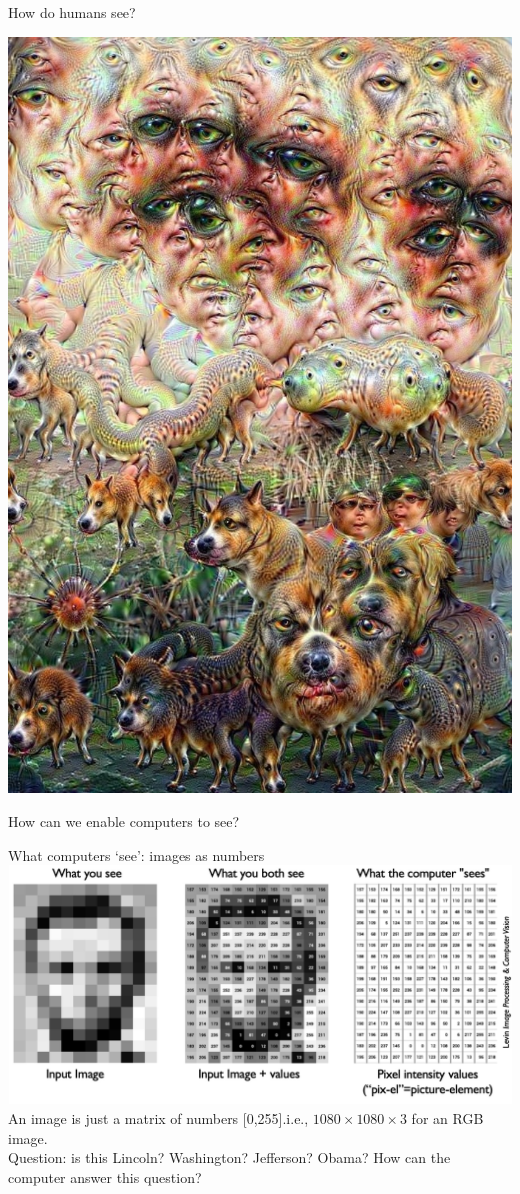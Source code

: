 \documentclass[default, aspectratio=169]{beamer}
\begin{document}
\begin{frame}{How do humans see?}
\begin{center}
			\includegraphics[keepaspectratio, scale=0.25]{pic/nothing.PNG}
		\end{center}
		How can we enable computers to see?
	\end{frame}
	\begin{frame}{What computers ‘see’: images as numbers}
		\centering
		\includegraphics[keepaspectratio, scale=0.35]{pic/what.png}
		\\{An image is just a matrix of numbers [0,255].i.e., $1080 \times 1080 \times 3$ for an RGB image.\\ Question: is this Lincoln? Washington? Jefferson? Obama?
			How can the computer answer this question?}
	\end{frame}
\end{document}

